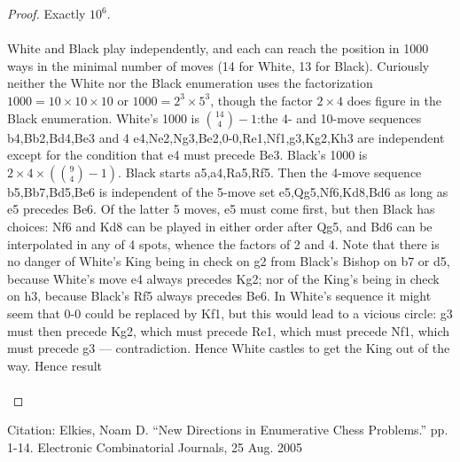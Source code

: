 \documentclass[12pt]{article}
\begin{document}
\begin{proof}
Exactly $10^6$. \\ \\
White and Black play independently, and each can reach the position in 1000 ways in the minimal number of moves (14 for White, 13 for Black). Curiously neither the White nor the Black enumeration uses the factorization $1000 = 10 \times 10 \times 10$ or $1000 = 2^3 \times 5^3$, though the factor $2 \times 4$ does figure in the Black enumeration. White's 1000 is ${14 \choose 4} -1$:the 4- and 10-move sequences b4,Bb2,Bd4,Be3 and 4 e4,Ne2,Ng3,Be2,0-0,Re1,Nf1,g3,Kg2,Kh3 are independent except for the condition that e4 must precede Be3. Black’s 1000 is$2 \times 4 \times ({9 \choose 4}-1)$. Black starts a5,a4,Ra5,Rf5. Then the
4-move sequence b5,Bb7,Bd5,Be6 is independent of the 5-move set e5,Qg5,Nf6,Kd8,Bd6 as long as e5 precedes Be6. Of the latter 5 moves, e5 must come first, but then Black has choices: Nf6 and Kd8 can be played in either order after Qg5, and Bd6 can be interpolated in any of 4 spots, whence the factors of 2 and 4. Note that there is no danger of White’s King being in check on g2 from Black’s Bishop on b7 or d5, because White’s move e4 always precedes Kg2; nor of the King’s being in check on h3, because Black’s Rf5 always precedes Be6. In White’s sequence it might seem that 0-0 could be replaced by Kf1, but this would lead to a vicious circle: g3 must then precede Kg2, which must precede Re1, which must precede Nf1, which must precede g3 — contradiction. Hence White castles to get the King out of the way. Hence result \\ \\

\end{proof}

Citation: Elkies, Noam D. “New Directions in Enumerative Chess Problems.” pp. 1-14. Electronic Combinatorial Journals, 25 Aug. 2005






\end{document}
